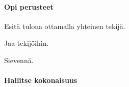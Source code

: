 \begin{tehtavasivu}

\paragraph*{Opi perusteet}

\begin{tehtava}
    Esitä tulona ottamalla yhteinen tekijä.
    \begin{alakohdat}
    \end{alakohdat}
    \begin{vastaus}
        \begin{alakohdat}
        \end{alakohdat}
    \end{vastaus}
\end{tehtava}

\begin{tehtava}
    Jaa tekijöihin.
    \begin{alakohdat}
    \end{alakohdat}
    \begin{vastaus}
        \begin{alakohdat}
        \end{alakohdat}
    \end{vastaus}
\end{tehtava}

\begin{tehtava}
    Sievennä.
    \begin{alakohdat}
    \end{alakohdat}
    \begin{vastaus}
        \begin{alakohdat}
        \end{alakohdat}
    \end{vastaus}
\end{tehtava}

\paragraph*{Hallitse kokonaisuus}


\end{tehtavasivu}
